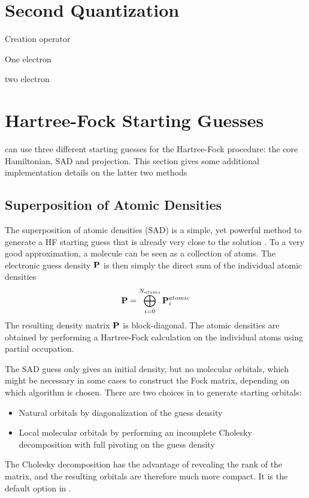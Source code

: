 \appendix
\chapter{Second Quantization}

Creation operator

One electron

two electron

\chapter{Hartree-Fock Starting Guesses \label{sec:SCFGUESS}}

\mchem{} can use three different starting guesses for the Hartree-Fock procedure: the core Hamiltonian, SAD and projection. This section gives some additional implementation details on the latter two methods

\section{Superposition of Atomic Densities}

The superposition of atomic densities (SAD) is a simple, yet powerful method to generate a HF starting guess that is already very close to the solution \cite{Van2006,Leh2019}. To a very good approximation, a molecule can be seen as a collection of atoms. The electronic guess density $\mathbf{P}$ is then simply the direct sum of the individual atomic densities 
\begin{equation}
\mathbf{P} = \bigoplus_{i=0}^{N_{atoms}} \mathbf{P}^{atomic}_i 
\end{equation}
\noindent The resulting density matrix $\mathbf{P}$ is block-diagonal. The atomic densities are obtained by performing a Hartree-Fock calculation on the individual atoms using partial occupation.

The SAD guess only gives an initial density, but no molecular orbitals, which might be necessary in some cases to construct the Fock matrix, depending on which algorithm is chosen. There are two choices in \mchem{} to generate starting orbitals:
\begin{itemize}
\item Natural orbitals by diagonalization of the guess density
\item Local molecular orbitals by performing an incomplete Cholesky decomposition with full pivoting on the guess density
\end{itemize}
The Cholesky decomposition has the advantage of revealing the rank of the matrix, and the resulting orbitals are therefore much more compact. It is the default option in \mchem{}.

